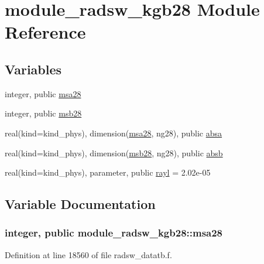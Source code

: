 \hypertarget{namespacemodule__radsw__kgb28}{}\section{module\+\_\+radsw\+\_\+kgb28 Module Reference}
\label{namespacemodule__radsw__kgb28}
\subsection*{Variables}
\begin{DoxyCompactItemize}
\item 
integer, public \hyperlink{namespacemodule__radsw__kgb28_a32c6693eb82a3ed47ed13e07f526471a}{msa28}
\item 
integer, public \hyperlink{group__module__radsw__main_ga55d73e39264b431135c6a9c809e20a94}{msb28}
\item 
real(kind=kind\+\_\+phys), dimension(\hyperlink{namespacemodule__radsw__kgb28_a32c6693eb82a3ed47ed13e07f526471a}{msa28}, ng28), public \hyperlink{group__module__radsw__main_ga5e48daf035b3b22b6e1b0f36aabcec10}{absa}
\item 
real(kind=kind\+\_\+phys), dimension(\hyperlink{group__module__radsw__main_ga55d73e39264b431135c6a9c809e20a94}{msb28}, ng28), public \hyperlink{group__module__radsw__main_gac3834ddd9d9e2106dc739094c800d09b}{absb}
\item 
real(kind=kind\+\_\+phys), parameter, public \hyperlink{group__module__radsw__main_gaf3641febf88e97741b2cd86a56eda843}{rayl} = 2.\+02e-\/05
\end{DoxyCompactItemize}


\subsection{Variable Documentation}
\subsubsection[{\texorpdfstring{msa28}{msa28}}]{\setlength{\rightskip}{0pt plus 5cm}integer, public module\+\_\+radsw\+\_\+kgb28\+::msa28}\hypertarget{namespacemodule__radsw__kgb28_a32c6693eb82a3ed47ed13e07f526471a}{}\label{namespacemodule__radsw__kgb28_a32c6693eb82a3ed47ed13e07f526471a}


Definition at line 18560 of file radsw\+\_\+datatb.\+f.

